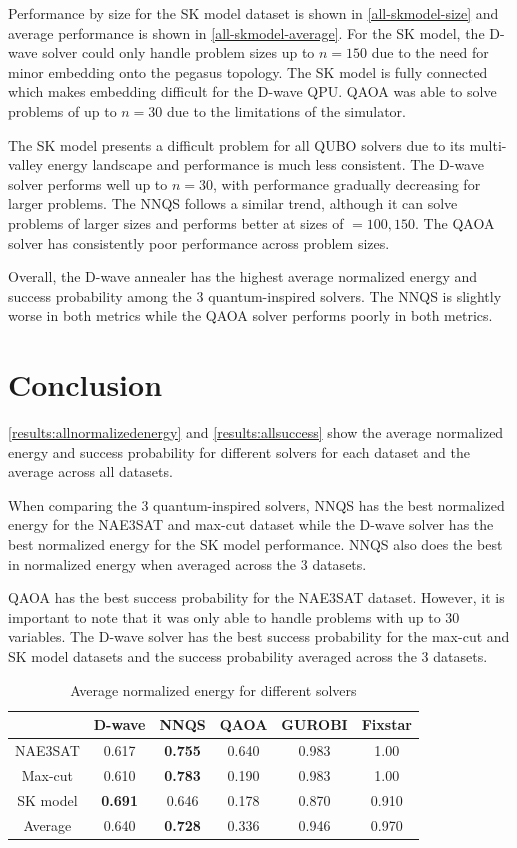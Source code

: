 Performance by size for the SK model dataset is shown in \autoref{all-skmodel-size} and average performance is shown in \autoref{all-skmodel-average}. For the SK model, the D-wave solver could only handle problem sizes up to $n=150$ due to the need for minor embedding onto the pegasus topology. The SK model is fully connected which makes embedding difficult for the D-wave QPU. QAOA was able to solve problems of up to $n=30$ due to the limitations of the simulator.

The SK model presents a difficult problem for all QUBO solvers due to its multi-valley energy landscape and performance is much less consistent. The D-wave solver performs well up to $n=30$, with performance gradually decreasing for larger problems. The NNQS follows a similar trend, although it can solve problems of larger sizes and performs better at sizes of $=100,150$. The QAOA solver has consistently poor performance across problem sizes.

Overall, the D-wave annealer has the highest average normalized energy and success probability among the 3 quantum-inspired solvers. The NNQS is slightly worse in both metrics while the QAOA solver performs poorly in both metrics.

\section{Conclusion}
\autoref{results:allnormalizedenergy} and \autoref{results:allsuccess} show the average normalized energy and success probability for different solvers for each dataset and the average across all datasets.

When comparing the 3 quantum-inspired solvers, NNQS has the best normalized energy for the NAE3SAT and max-cut dataset while the D-wave solver has the best normalized energy for the SK model performance. NNQS also does the best in normalized energy when averaged across the 3 datasets. 

QAOA has the best success probability for the NAE3SAT dataset. However, it is important to note that it was only able to handle problems with up to $30$ variables. The D-wave solver has the best success probability for the max-cut and SK model datasets and the success probability averaged across the 3 datasets.

\begin{table}[!ht]
    \centering
    \begin{tabular}{cccccc} \toprule
        ~ & D-wave & NNQS & QAOA & GUROBI & Fixstar \\ \midrule
        NAE3SAT & 0.617 & \textbf{0.755} & 0.640 & 0.983 & 1.00 \\
        Max-cut & 0.610 & \textbf{0.783} & 0.190 & 0.983 & 1.00 \\
        SK model & \textbf{0.691} & 0.646 & 0.178 & 0.870 & 0.910 \\ \midrule
        Average & 0.640 & \textbf{0.728} & 0.336 & 0.946 & 0.970 \\ \bottomrule
    \end{tabular}
    \caption{Average normalized energy for different solvers}
    \label{results:allnormalizedenergy}
\end{table}


